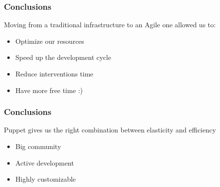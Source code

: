\documentclass[aspectratio=169]{beamer}
\begin{document}
\begin{frame}
    \frametitle{Conclusions}
    Moving from a traditional infrastructure to an Agile one allowed us to:
    \begin{itemize}
        \item Optimize our resources
        \item Speed up the development cycle
        \item Reduce interventions time
        \item Have more free time :)
    \end{itemize}
\end{frame}


\begin{frame}
    \frametitle{Conclusions}
    Puppet gives us the right combination between elasticity and efficiency \\

    \begin{itemize}
        \item Big community
        \item Active development
        \item Highly customizable
    \end{itemize}

\end{frame}


\cernSplashBlue
\end{document}
